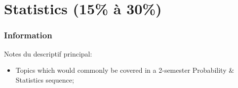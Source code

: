 \documentclass[12pt, titlepage, french]{report}
\begin{document}
\newpage

\chapter[Statistics]{Statistics (15\% à 30\%)}

\subsection{Information}

\begin{distributions}[Description]
Notes du descriptif principal:
\begin{itemize}
	\item	Topics which would commonly be covered in a 2-semester Probability \& Statistics sequence;
\end{itemize}
\end{distributions}
\end{document}
